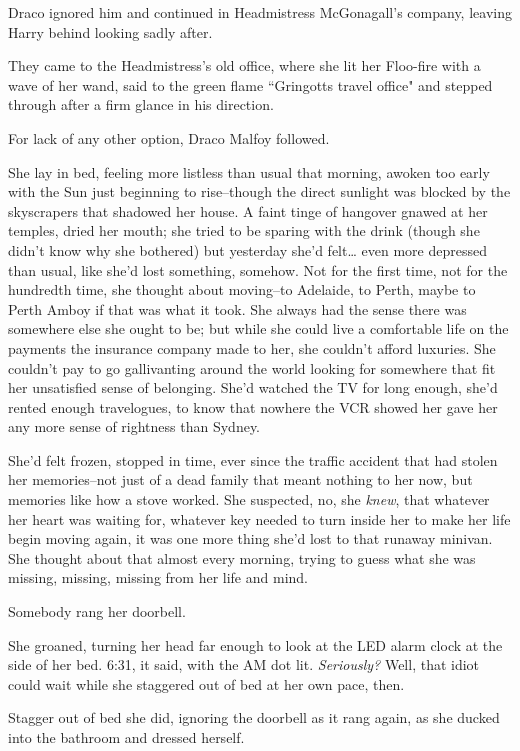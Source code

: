 Draco ignored him and continued in Headmistress McGonagall's company, leaving Harry behind looking sadly after.

They came to the Headmistress's old office, where she lit her Floo-fire with a wave of her wand, said to the green flame ``Gringotts travel office" and stepped through after a firm glance in his direction.

For lack of any other option, Draco Malfoy followed.

\later

She lay in bed, feeling more listless than usual that morning, awoken too early with the Sun just beginning to rise\---though the direct sunlight was blocked by the skyscrapers that shadowed her house. A faint tinge of hangover gnawed at her temples, dried her mouth; she tried to be sparing with the drink (though she didn't know why she bothered) but yesterday she'd felt{\ldots} even more depressed than usual, like she'd lost something, somehow. Not for the first time, not for the hundredth time, she thought about moving\---to Adelaide, to Perth, maybe to Perth Amboy if that was what it took. She always had the sense there was somewhere else she ought to be; but while she could live a comfortable life on the payments the insurance company made to her, she couldn't afford luxuries. She couldn't pay to go gallivanting around the world looking for somewhere that fit her unsatisfied sense of belonging. She'd watched the TV for long enough, she'd rented enough travelogues, to know that nowhere the VCR showed her gave her any more sense of rightness than Sydney.

She'd felt frozen, stopped in time, ever since the traffic accident that had stolen her memories\---not just of a dead family that meant nothing to her now, but memories like how a stove worked. She suspected, no, she \emph{knew}, that whatever her heart was waiting for, whatever key needed to turn inside her to make her life begin moving again, it was one more thing she'd lost to that runaway minivan. She thought about that almost every morning, trying to guess what she was missing, missing, missing from her life and mind.

Somebody rang her doorbell.

She groaned, turning her head far enough to look at the LED alarm clock at the side of her bed. 6:31, it said, with the AM dot lit. \emph{Seriously?} Well, that idiot could wait while she staggered out of bed at her own pace, then.

Stagger out of bed she did, ignoring the doorbell as it rang again, as she ducked into the bathroom and dressed herself.

